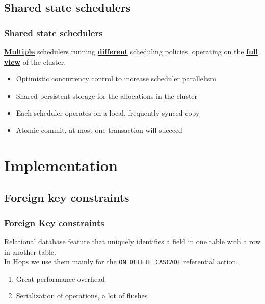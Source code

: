 \documentclass{beamer}
\begin{document}
\subsection{Shared state schedulers}
\begin{frame}
\frametitle{Shared state schedulers}
\textbf{\underline{Multiple}} schedulers running \textbf{\underline{different}} scheduling
policies, operating on the \textbf{\underline{full view}} of the cluster.
\begin{itemize}
\item Optimistic concurrency control to increase scheduler parallelism
\item Shared persistent storage for the allocations in the cluster
\item Each scheduler operates on a local, frequently synced copy
\item Atomic commit, at most one transaction will succeed
\end{itemize}
\end{frame}

\section{Implementation}
\subsection{Foreign key constraints}
\begin{frame}
\frametitle{Foreign Key constraints}
Relational database feature that uniquely identifies a field in one
table with a row in another table.\\[2em]

In Hops we use them mainly for the \texttt{ON DELETE CASCADE}
referential action.

\begin{enumerate}
\item {\color{red} Great} performance overhead
\item Serialization of operations, a lot of {\color{red} flushes}
\end{enumerate}
\end{frame}
\end{document}
